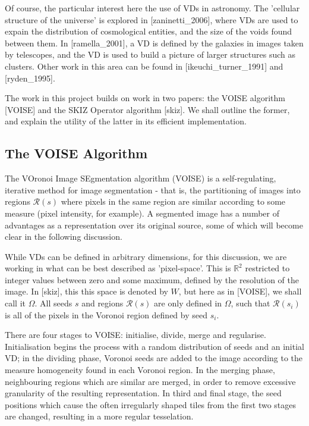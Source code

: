 \documentclass[12pt, report, a4paper, titlepage]{article}
\numberwithin{equation}{section}
\newcommand*{\citen}{}%
\DeclareRobustCommand*{\citen}[1]{%
  \begingroup
    \romannumeral-`\x %
    \setcitestyle{numbers}%
    \cite{#1}%
  \endgroup
}
\begin{document}
Of course, the particular interest here the use of VDs in astronomy. The 'cellular structure of the universe' is explored in [\citen{zaninetti_2006}], where VDs are used to expain the distribution of cosmological entities, and the size of the voids found between them. In [\citen{ramella_2001}], a VD is defined by the galaxies in images taken by telescopes, and the VD is used to build a picture of larger structures such as clusters. Other work in this area can be found in [\citen{ikeuchi_turner_1991}] and [\citen{ryden_1995}].

The work in this project builds on work in two papers: the VOISE algorithm [\citen{VOISE}] and the SKIZ Operator algorithm [\citen{skiz}]. We shall outline the former, and explain the utility of the latter in its efficient implementation.

\subsection{The VOISE Algorithm}

The VOronoi Image SEgmentation algorithm (VOISE) is a self-regulating, iterative method for image segmentation - that is, the partitioning of images into regions $\mathcal{R}(s)$ where pixels in the same region are similar according to some measure (pixel intensity, for example). A segmented image has a number of advantages as a representation over its original source, some of which will become clear in the following discussion.

While VDs can be defined in arbitrary dimensions, for this discussion, we are working in what can be best described as 'pixel-space'. This is $\mathbb{R}^2$ restricted to integer values between zero and some maximum, defined by the resolution of the image. In [\citen{skiz}], this this space is denoted by $W$, but here as in [\citen{VOISE}], we shall call it $\Omega$. All seeds $s$ and regions $\mathcal{R}(s)$ are only defined in $\Omega$, such that $\mathcal{R}(s_i)$ is all of the pixels in the Voronoi region defined by seed $s_i$.

There are four stages to VOISE: initialise, divide, merge and regularise. Initialisation begins the process with a random distribution of seeds and an initial VD; in the dividing phase, Voronoi seeds are added to the image according to the measure homogeneity found in each Voronoi region. In the merging phase, neighbouring regions which are similar are merged, in order to remove excessive granularity of the resulting representation. In third and final stage, the seed positions which cause the often irregularly shaped tiles from the first two stages are changed, resulting in a more regular tesselation.
\end{document}

